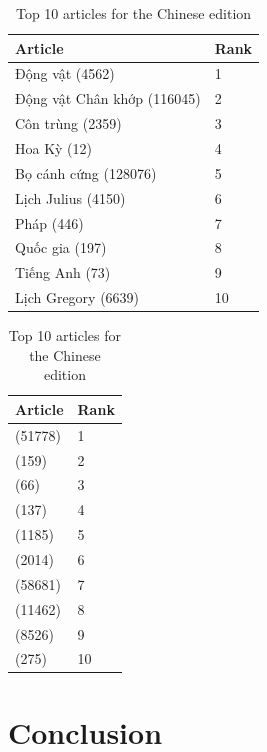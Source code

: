 \begin{table}[htbp]
    \begin{minipage}{.45\linewidth}
        \centering
        \begin{tabular}{ll}
            \toprule
            Article & Rank\\
            \midrule
            Động vật (4562) & 1\\
            Động vật Chân khớp (116045) & 2\\
            Côn trùng (2359) & 3\\
            Hoa Kỳ (12) & 4\\
            Bọ cánh cứng (128076) & 5\\
            Lịch Julius (4150) & 6\\
            Pháp (446) & 7\\
            Quốc gia (197) & 8\\
            Tiếng Anh (73) & 9\\
            Lịch Gregory (6639) & 10\\
            \bottomrule
        \end{tabular}
        \caption{Top 10 articles for the Vietnamese edition}
    \end{minipage}
    \hfill
    \begin{minipage}{.45\linewidth}
        \centering
        \begin{tabular}{ll}
            \toprule
            Article & Rank\\
            \midrule
            (51778) & 1\\
            (159) & 2\\
            (66) & 3\\
            (137) & 4\\
            (1185) & 5\\
            (2014) & 6\\
            (58681) & 7\\
            (11462) & 8\\
            (8526) & 9\\
            (275) & 10\\
            \bottomrule
        \end{tabular}
        \caption{Top 10 articles for the Chinese edition}
    \end{minipage}
\end{table}

\section{Conclusion}
